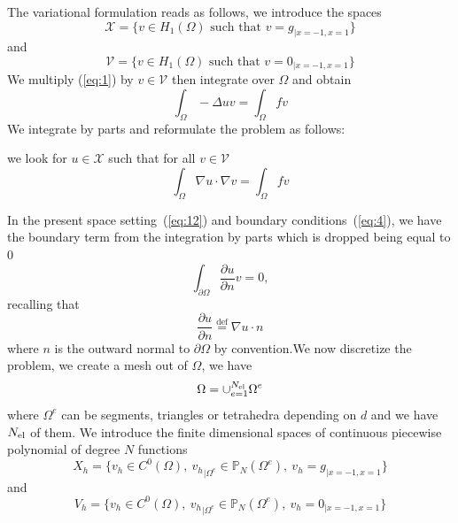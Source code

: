 \noindent
The variational formulation reads as follows, we introduce the spaces
\begin{equation}
  \label{eq:11}
  \mathcal{X} = \Big\{ v \in H_1(\Omega) \text{ such that } v=g_{|x=-1,x=1} \Big\}
\end{equation}
and
\begin{equation}
  \label{eq:12}
  \mathcal{V} = \Big\{ v \in H_1(\Omega) \text{ such that } v=0_{|x=-1,x=1} \Big\}
\end{equation}
We multiply (\ref{eq:1}) by $v \in \mathcal{V}$ then integrate over $\Omega$ and obtain
\begin{equation}
  \label{eq:13}
  \int_\Omega -\Delta u v = \int_\Omega f v
\end{equation}
We integrate by parts and reformulate the problem as follows:
\begin{problem}
we look
for $u \in \mathcal{X}$ such that for all $v \in \mathcal{V}$
\begin{equation}
  \label{eq:14}
  \int_\Omega \nabla u \cdot \nabla v  = \int_\Omega f v
\end{equation}

\end{problem}
In the present space setting~(\ref{eq:12}) and boundary
conditions~(\ref{eq:4}), we have the boundary term from the integration by
parts which is dropped being equal to 0
\begin{equation}
  \label{eq:15}
  \int_{\partial \Omega} \frac{\partial u}{\partial n} v = 0,
\end{equation}
recalling that
\begin{equation}
  \label{eq:21}
  \frac{\partial u}{\partial n} \stackrel{\text{def}}{=} \nabla u \cdot n
\end{equation}
where $n$ is the outward normal to $\partial \Omega$ by convention.We
now discretize the problem, we create a mesh out of $\Omega$, we have
\begin{equation}
  \label{eq:10}
  \Omega = \cup_{e=1}^{N_{\text{el}}} \Omega^e
\end{equation}
where $\Omega^e$ can be segments, triangles or tetrahedra depending on
$d$ and we have ${N_{\text{el}}}$ of them. We introduce the finite dimensional
spaces of continuous piecewise polynomial of degree $N$ functions
\begin{equation}
  \label{eq:17}
  X_h = \Big\{ v_h  \in C^0(\Omega),\ {v_h}_{|\Omega^e} \in \mathbb{P}_N( \Omega^e ),\   v_h=g_{|x=-1,x=1}\Big\}
\end{equation}
and
\begin{equation}
  \label{eq:18}
  V_h = \Big\{ v_h \in C^0(\Omega),\ {v_h}_{|\Omega^e} \in \mathbb{P}_N( \Omega^e ),\   v_h=0_{|x=-1,x=1}\Big\}
\end{equation}
